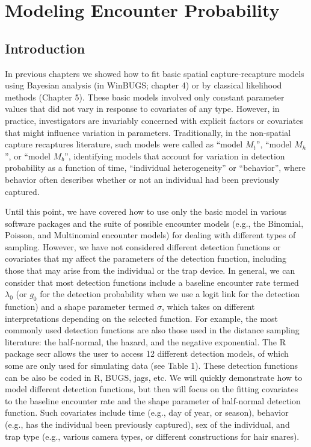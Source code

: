 \chapter{
Modeling Encounter Probability
}
\label{chapt.covariates}

\vspace{.3in}

\section{Introduction}

In previous chapters we showed how to fit basic spatial capture-recapture models using Bayesian analysis (in WinBUGS; chapter 4) or by classical likelihood methods (Chapter 5). These basic models involved only constant parameter values that did not vary in response to covariates of any type.  However, in practice, investigators are invariably concerned with explicit factors or covariates that might influence variation in parameters. Traditionally, in the non-spatial capture recaptures literature, such models were called as ``model $M_t$'', ``model $M_h$'', or ``model $M_b$'', identifying models that account for variation in detection probability as a function of time, ``individual heterogeneity'' or ``behavior'', where behavior often describes whether or not an individual had been previously captured.   

Until this point, we have covered how to use only the basic model in various software packages and the suite of possible encounter models (e.g., the Binomial, Poisson, and Multinomial encounter models) for dealing with different types of sampling.  However, we have not considered different detection functions or covariates that my affect the parameters of the detection function, including those that may arise from the individual or the trap device.  In general, we can consider that most detection functions include a baseline encounter rate termed $\lambda_0$ (or $g_0$ for the detection probability when we use a logit link for the detection function) and a shape parameter termed $\sigma$, which takes on different interpretations depending on the selected function.  For example, the most commonly used detection functions are also those used in the distance sampling literature: the half-normal, the hazard, and the negative exponential.  The R package secr allows the user to access 12 different detection models, of which some are only used for simulating data (see Table 1).   These detection functions can be also be coded in R, BUGS, jags, etc.   We will quickly demonstrate how to model different detection functions, but then will focus on the fitting covariates to the baseline encounter rate and the shape parameter of half-normal detection function.  Such covariates include time (e.g., day of year, or season), behavior (e.g., has the individual been previously captured), sex of the individual, and trap type (e.g., various camera types, or different constructions for hair snares). 

